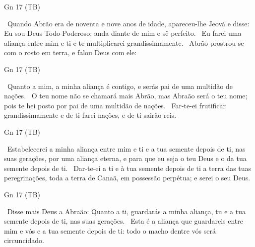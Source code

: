 \documentclass[12pt,aspectratio=169]{beamer}
\newcommand{\ver}[1]{%
    \raisebox{0.50ex}{%
        \scalebox{1.1}{%
            \pmb{\textbf{\textcolor{BSpbg}{#1}}}%
        }%
    }%
}
\newcommand{\QUOTE}[1]{%
    \par\noindent\hspace*{0.05\linewidth}%
    \begin{minipage}{0.9\linewidth}%
        \linespread{1.35}\large{#1}%
    \end{minipage}%
}
\newcommand{\YEL}[1]{{\textcolor{TXyel}{#1}}}
\newcommand{\GRE}[1]{{\textcolor{TXgre}{#1}}}
\newcommand{\CYA}[1]{{\textcolor{TXcya}{#1}}}
\newcommand{\BLU}[1]{{\textcolor{TXblu}{#1}}}
\newcommand{\MAG}[1]{{\textcolor{TXmag}{#1}}}
\newcommand{\BRI}[1]{{\textcolor{BSpbg}{#1}}}   %
\begin{document}
    \begin{frame}{\BRI{Gn 17} (TB)}
        \QUOTE{%
            \ver{1}~Quando Abrão era de \YEL{noventa e nove anos} de idade, apareceu-lhe Jeová e
            disse: \CYA{Eu sou Deus Todo-Poderoso}; \MAG{anda diante de mim e sê perfeito}.
            \ver{2}~\BLU{Eu farei} uma \YEL{aliança} entre mim e ti e te \YEL{multiplicarei
            grandissimamente}.
            \ver{3}~Abrão prostrou-se com o rosto em terra, e falou Deus com ele:
        }
    \end{frame}

    \begin{frame}{\BRI{Gn 17} (TB)}
        \QUOTE{%
            \ver{4}~Quanto a mim, a minha aliança é contigo, e serás \YEL{pai de uma multidão de
            nações}.
            \ver{5}~O teu nome não se chamará mais Abrão, mas \YEL{Abraão será o teu nome}; pois
            te hei posto por \YEL{pai de uma multidão de nações}.
            \ver{6}~Far-te-ei frutificar grandissimamente e de ti farei \YEL{nações}, e de ti
            sairão \MAG{reis}.
        }
    \end{frame}

    \begin{frame}{\BRI{Gn 17} (TB)}
        \QUOTE{%
            \ver{7}~\YEL{Estabelecerei} a minha aliança \GRE{entre mim e ti e a tua semente
            depois de ti}, nas suas gerações, por uma \CYA{aliança eterna}, e para que \BLU{eu
            seja o teu Deus e o da tua semente depois de ti}.
            \ver{8}~Dar-te-ei a \YEL{ti} e à tua \YEL{semente} depois de ti a \YEL{terra} das
            tuas peregrinações, toda a \YEL{terra} de Canaã, em \GRE{possessão} \YEL{perpétua};
            e \BLU{serei o seu Deus}.
        }
    \end{frame}

    \begin{frame}{\BRI{Gn 17} (TB)}
        \QUOTE{%
            \ver{9}~Disse mais Deus a Abraão: Quanto a ti, \MAG{guardarás a minha aliança, tu e
            a tua semente} depois de ti, nas suas gerações.
            \ver{10}~\YEL{Esta é} a aliança que \YEL{guardareis} entre mim e vós e a tua semente
            depois de ti: \MAG{todo o macho dentre vós será circuncidado}.
        }
    \end{frame}
\end{document}
